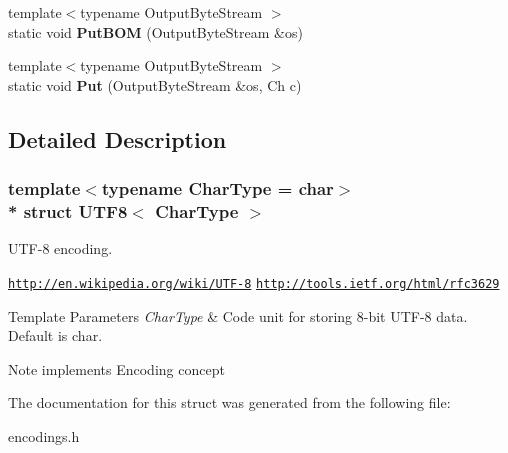 \begin{DoxyCompactItemize}
\item 
{\footnotesize template$<$typename Output\+Byte\+Stream $>$ }\\static void {\bfseries Put\+B\+OM} (Output\+Byte\+Stream \&os)\hypertarget{a00333_a6b171e5f0662ad81d498875bbdbc536a}{}\label{a00333_a6b171e5f0662ad81d498875bbdbc536a}

\item 
{\footnotesize template$<$typename Output\+Byte\+Stream $>$ }\\static void {\bfseries Put} (Output\+Byte\+Stream \&os, Ch c)\hypertarget{a00333_ab24c23227413798e9be28a21eb26fe51}{}\label{a00333_ab24c23227413798e9be28a21eb26fe51}

\end{DoxyCompactItemize}


\subsection{Detailed Description}
\subsubsection*{template$<$typename Char\+Type = char$>$\\*
struct U\+T\+F8$<$ Char\+Type $>$}

U\+T\+F-\/8 encoding. 

\href{http://en.wikipedia.org/wiki/UTF-8}{\tt http\+://en.\+wikipedia.\+org/wiki/\+U\+T\+F-\/8} \href{http://tools.ietf.org/html/rfc3629}{\tt http\+://tools.\+ietf.\+org/html/rfc3629} 
\begin{DoxyTemplParams}{Template Parameters}
{\em Char\+Type} & Code unit for storing 8-\/bit U\+T\+F-\/8 data. Default is char. \\
\hline
\end{DoxyTemplParams}
\begin{DoxyNote}{Note}
implements Encoding concept 
\end{DoxyNote}


The documentation for this struct was generated from the following file\+:\begin{DoxyCompactItemize}
\item 
encodings.\+h\end{DoxyCompactItemize}

